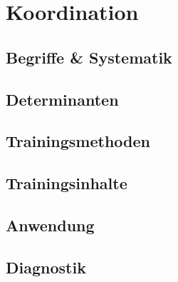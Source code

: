 \section{Koordination}

\subsection{Begriffe \& Systematik}

\subsection{Determinanten}

\subsection{Trainingsmethoden}

\subsection{Trainingsinhalte}

\subsection{Anwendung}

\subsection{Diagnostik}
